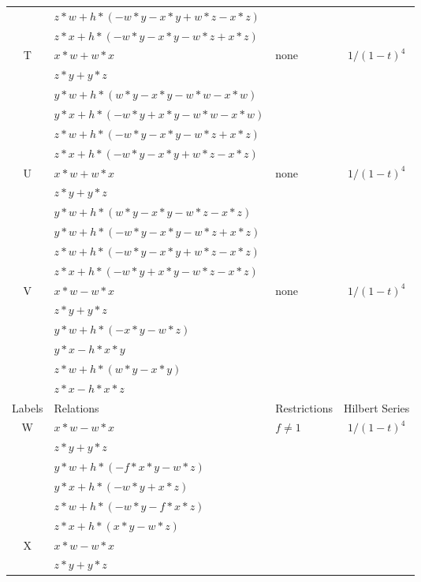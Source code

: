 \documentclass[12]{article}
\begin{document}
\begin{longtable}[c]{|c|p{5.75cm}|p{2.75cm}|c|}
   & $ z*w + h*(-w*y - x*y + w*z - x*z ) $ & & \\ 
   & $ z*x + h*(-w*y - x*y - w*z + x*z ) $ & &  \\  
\hline
 T & $ x*w + w*x $ &\multirow{6}{*}{none} &\multirow{6}{*}{$ 1/(1-t)^4 $} \\ 
    & $ z*y + y*z $ & &  \\   
   & $ y*w + h*(w*y - x*y - w*w - x*w ) $ & & \\  
   & $ y*x + h*(-w*y + x*y - w*w - x*w ) $ & & \\  
   & $  z*w + h*(-w*y - x*y - w*z + x*z ) $ & & \\ 
   & $  z*x + h*(-w*y - x*y + w*z - x*z ) $ & &  \\  
\hline
 U & $ x*w + w*x $ &\multirow{6}{*}{none} &\multirow{6}{*}{$ 1/(1-t)^4 $} \\ 
    & $ z*y + y*z $ & &  \\   
   & $ y*w + h*(w*y - x*y - w*z - x*z ) $ & & \\ 
   & $ y*w + h*(-w*y - x*y - w*z + x*z ) $ & & \\  
   & $ z*w + h*(-w*y - x*y + w*z - x*z ) $ & & \\ 
   & $ z*x + h*(-w*y + x*y - w*z - x*z ) $ & &  \\  
\hline
 V & $ x*w - w*x $ &\multirow{6}{*}{none} &\multirow{6}{*}{$ 1/(1-t)^4 $} \\ 
    & $ z*y + y*z $ & &  \\ 
   & $ y*w + h*(-x*y - w*z ) $ & & \\  
   & $ y*x - h*x*y $ & & \\  
   & $ z*w + h*(w*y - x*y ) $ & & \\ 
   & $ z*x - h*x*z $ & &  \\  
\hline
\pagebreak
\midrule[1.0pt]
Labels & Relations & Restrictions & Hilbert Series \\
\hline
 W & $ x*w - w*x $ &\multirow{6}{*}{ $ f \neq 1 $} &\multirow{6}{*}{$ 1/(1-t)^4 $} \\ 
    & $ z*y + y*z $ & &  \\  
   & $ y*w + h*(-f*x*y - w*z ) $ & & \\  
   & $ y*x + h*(-w*y + x*z ) $ & & \\  
   & $ z*w + h*(-w*y - f*x*z ) $ & & \\ 
   & $ z*x + h*(x*y - w*z ) $ & &  \\  
\hline
 X & $ x*w - w*x $ & & \\ 
    & $ z*y + y*z $ & &  \\ 

\end{longtable}
\end{document}
